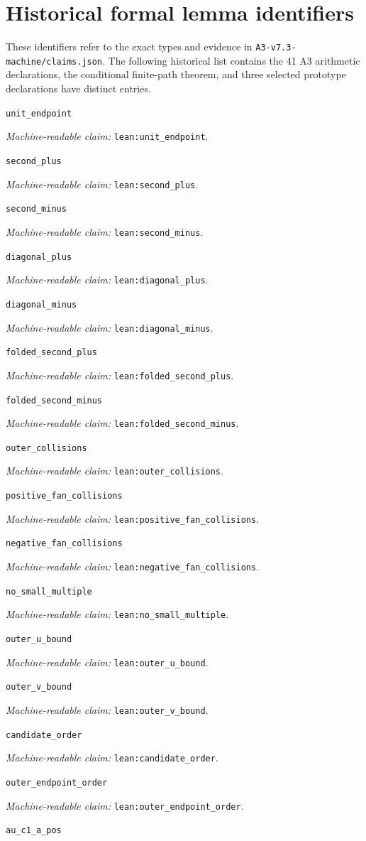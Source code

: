 \documentclass[11pt]{amsart}
\newcommand{\record}[1]{\nolinkurl{#1}}
\newcommand{\claimid}[1]{\par\nopagebreak\noindent\textit{Machine-readable claim:} \record{#1}.\par}
\begin{document}
\section*{Historical formal lemma identifiers}
These identifiers refer to the exact types and evidence in \record{A3-v7.3-machine/claims.json}.
The following historical list contains the 41 A3 arithmetic declarations, the conditional finite-path theorem,
and three selected prototype declarations have distinct entries.
\par\noindent\label{lean:unit_endpoint}\record{unit_endpoint}
\claimid{lean:unit_endpoint}
\par\noindent\label{lean:second_plus}\record{second_plus}
\claimid{lean:second_plus}
\par\noindent\label{lean:second_minus}\record{second_minus}
\claimid{lean:second_minus}
\par\noindent\label{lean:diagonal_plus}\record{diagonal_plus}
\claimid{lean:diagonal_plus}
\par\noindent\label{lean:diagonal_minus}\record{diagonal_minus}
\claimid{lean:diagonal_minus}
\par\noindent\label{lean:folded_second_plus}\record{folded_second_plus}
\claimid{lean:folded_second_plus}
\par\noindent\label{lean:folded_second_minus}\record{folded_second_minus}
\claimid{lean:folded_second_minus}
\par\noindent\label{lean:outer_collisions}\record{outer_collisions}
\claimid{lean:outer_collisions}
\par\noindent\label{lean:positive_fan_collisions}\record{positive_fan_collisions}
\claimid{lean:positive_fan_collisions}
\par\noindent\label{lean:negative_fan_collisions}\record{negative_fan_collisions}
\claimid{lean:negative_fan_collisions}
\par\noindent\label{lean:no_small_multiple}\record{no_small_multiple}
\claimid{lean:no_small_multiple}
\par\noindent\label{lean:outer_u_bound}\record{outer_u_bound}
\claimid{lean:outer_u_bound}
\par\noindent\label{lean:outer_v_bound}\record{outer_v_bound}
\claimid{lean:outer_v_bound}
\par\noindent\label{lean:candidate_order}\record{candidate_order}
\claimid{lean:candidate_order}
\par\noindent\label{lean:outer_endpoint_order}\record{outer_endpoint_order}
\claimid{lean:outer_endpoint_order}
\par\noindent\label{lean:au_c1_a_pos}\record{au_c1_a_pos}
\end{document}
